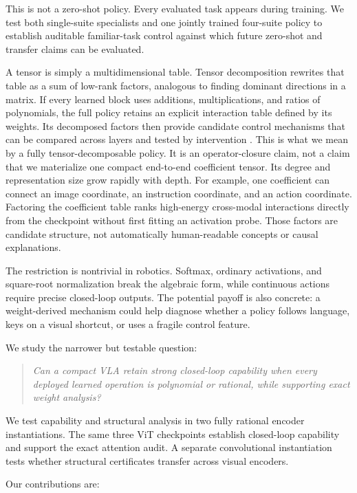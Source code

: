 \documentclass{article}
\begin{document}
This is not a zero-shot policy. Every evaluated task appears during training. We test both
single-suite specialists and one jointly trained four-suite policy to establish auditable
familiar-task control against which future zero-shot and transfer claims can be evaluated.

A tensor is simply a multidimensional table. Tensor decomposition rewrites that table as a sum
of low-rank factors, analogous to finding dominant directions in a matrix. If every learned block
uses additions, multiplications, and ratios of polynomials, the full policy retains an explicit
interaction table defined by its weights. Its decomposed factors then provide candidate control
mechanisms that can be compared across layers and tested by intervention \cite{pearce,chinets}.
This is what we mean by a fully tensor-decomposable policy. It is an operator-closure claim, not a
claim that we materialize one compact end-to-end coefficient tensor. Its degree and representation
size grow rapidly with depth. For example, one coefficient can connect an image coordinate, an
instruction coordinate, and an action coordinate. Factoring the coefficient table ranks
high-energy cross-modal interactions directly from the checkpoint without first fitting an
activation probe. Those factors are candidate structure, not automatically human-readable
concepts or causal explanations.

The restriction is nontrivial in robotics. Softmax, ordinary activations, and square-root
normalization break the algebraic form, while continuous actions require precise closed-loop
outputs. The potential payoff is also concrete: a weight-derived mechanism could help diagnose
whether a policy follows language, keys on a visual shortcut, or uses a fragile control feature.

We study the narrower but testable question:

\begin{quote}
\emph{Can a compact VLA retain strong closed-loop capability when every deployed learned
operation is polynomial or rational, while supporting exact weight analysis?}
\end{quote}

We test capability and structural analysis in two fully rational encoder instantiations. The same
three ViT checkpoints establish closed-loop capability and support the exact attention audit. A
separate convolutional instantiation tests whether structural certificates transfer across visual
encoders.

Our contributions are:
\end{document}
